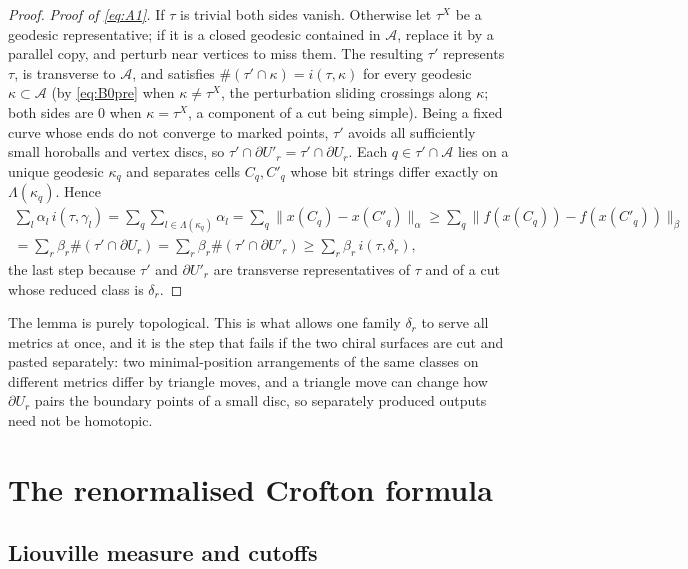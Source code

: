 \documentclass[aps,prd,onecolumn,superscriptaddress,nofootinbib,amsmath,amssymb,11pt]{revtex4-2}
\theoremstyle{definition}
\begin{document}
\begin{proof}
\emph{Proof of \eqref{eq:A1}.} If $\tau$ is trivial both sides vanish. Otherwise let $\tau^X$ be a geodesic
representative; if it is a closed geodesic contained in $\mathcal A$, replace it by a parallel copy, and perturb
near vertices to miss them. The resulting $\tau'$ represents $\tau$, is transverse to $\mathcal A$, and satisfies
$\#(\tau'\cap\kappa)=i(\tau,\kappa)$ for every geodesic $\kappa\subset\mathcal A$ (by \eqref{eq:B0pre} when
$\kappa\ne\tau^X$, the perturbation sliding crossings along $\kappa$; both sides are $0$ when $\kappa=\tau^X$, a
component of a cut being simple). Being a fixed curve whose ends do not converge to marked points, $\tau'$ avoids
all sufficiently small horoballs and vertex discs, so $\tau'\cap\partial U'_r=\tau'\cap\partial U_r$. Each
$q\in\tau'\cap\mathcal A$ lies on a unique geodesic $\kappa_q$ and separates cells $C_q,C'_q$ whose bit strings
differ exactly on $\Lambda(\kappa_q)$. Hence
\begin{multline*}
\sum_l\alpha_l\,i(\tau,\gamma_l)=\sum_q\sum_{l\in\Lambda(\kappa_q)}\alpha_l=\sum_q\|x(C_q)-x(C'_q)\|_\alpha
\ge\sum_q\|f(x(C_q))-f(x(C'_q))\|_\beta\\
=\sum_r\beta_r\#(\tau'\cap\partial U_r)=\sum_r\beta_r\#(\tau'\cap\partial U'_r)\ge\sum_r\beta_r\,i(\tau,\delta_r),
\end{multline*}
the last step because $\tau'$ and $\partial U'_r$ are transverse representatives of $\tau$ and of a cut whose
reduced class is $\delta_r$.
\end{proof}

The lemma is purely topological. This is what allows one family $\delta_r$ to serve all metrics at once, and it
is the step that fails if the two chiral surfaces are cut and pasted separately: two minimal-position arrangements
of the same classes on different metrics differ by triangle moves, and a triangle move can change how
$\partial U_r$ pairs the boundary points of a small disc, so separately produced outputs need not be homotopic.

\section{The renormalised Crofton formula}\label{sec:crofton}

\subsection{Liouville measure and cutoffs}
\end{document}
